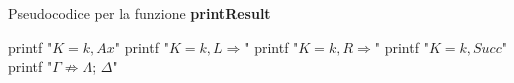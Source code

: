 \documentclass[\main/tesi.tex]{subfiles}
\begin{document}
\begin{algorithm}
    \caption{Pseudocodice per la funzione \textbf{printResult}}\label{alg:printResult}
    \begin{algorithmic}
        \State printf "$K = k, Ax$"
        \State printf "$K = k, L\Rightarrow$"
        \State printf "$K = k, R\Rightarrow$"
        \State printf "$K = k, Succ$"
        \EndIf
        \State printf "$\Gamma \not\Rightarrow \Lambda$; $\Delta$"
        \EndFor
        \EndProcedure
    \end{algorithmic}
\end{algorithm}
\end{document}
